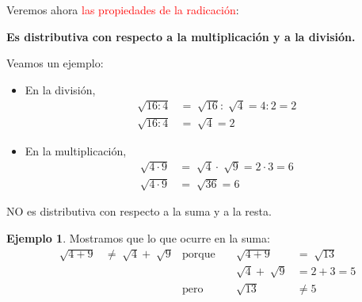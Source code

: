 \documentclass[12pt]{examdesign}
\theoremstyle{plain}
\theoremstyle{definition}
\newtheorem{exa}[theorem]{Ejemplo}
\theoremstyle{remark}
\begin{document}
\begin{endmatter}
	    Veremos ahora \textcolor{red}{las propiedades de la radicación}:
	    
	    \textbf{Es distributiva con respecto a la multiplicación y a la división.}
	    
	    Veamos un ejemplo:
	    
	    \begin{itemize}
	    	\item En la división,
	    	    \begin{align*}
	    	        \sqrt[]{16:4}&=\sqrt[]{16}:\sqrt[]{4}=4:2=2\\
	    	        \sqrt[]{16:4}&=\sqrt[]{4}=2
	    	    \end{align*}
	    	\item  En la multiplicación,
	    	    \begin{align*}
	    	        \sqrt[]{4\cdot 9}&=\sqrt[]{4}\cdot\sqrt[]{9}=2\cdot 3=6\\
	    	        \sqrt[]{4\cdot 9}&=\sqrt[]{36}=6
	    	    \end{align*}
	    \end{itemize}
	    
	    
	    
	    NO es distributiva con respecto a la suma y a la resta.
	    
	    \begin{exa} Mostramos que lo que ocurre en la suma:
	    	\begin{align*}
	    	\sqrt[]{4 + 9}&\not= \sqrt[]{4}+\sqrt[]{9}&              \mbox{porque}&&                  \sqrt[]{4 + 9}&=\sqrt[]{13} \\
	    	              &                           &                           &&           \sqrt[]{4}+\sqrt[]{9}&= 2 + 3 = 5  \\
	    	              &                           &                \mbox{pero}&&                     \sqrt[]{13}&\not= 5
	    	\end{align*}
	    \end{exa}
	    

\end{endmatter}
\end{document}
